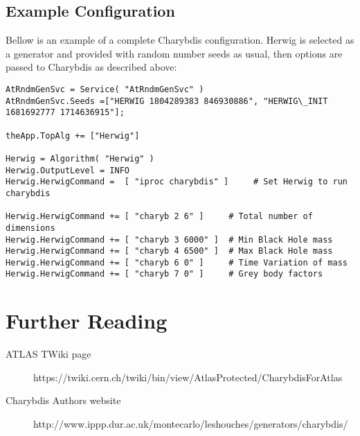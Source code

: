 \documentclass[11pt]{article}
\begin{document}
\subsection*{Example Configuration}

Bellow is an example of a complete Charybdis configuration. Herwig is selected as a generator and provided with random number seeds as usual, then options are passed to Charybdis as described above:

\begin{verbatim}
AtRndmGenSvc = Service( "AtRndmGenSvc" )
AtRndmGenSvc.Seeds =["HERWIG 1804289383 846930886", "HERWIG\_INIT 1681692777 1714636915"];

theApp.TopAlg += ["Herwig"]

Herwig = Algorithm( "Herwig" )
Herwig.OutputLevel = INFO
Herwig.HerwigCommand =  [ "iproc charybdis" ]     # Set Herwig to run charybdis

Herwig.HerwigCommand += [ "charyb 2 6" ]     # Total number of dimensions
Herwig.HerwigCommand += [ "charyb 3 6000" ]  # Min Black Hole mass
Herwig.HerwigCommand += [ "charyb 4 6500" ]  # Max Black Hole mass
Herwig.HerwigCommand += [ "charyb 6 0" ]     # Time Variation of mass
Herwig.HerwigCommand += [ "charyb 7 0" ]     # Grey body factors
\end{verbatim}

\section*{Further Reading}
\begin{description}
\item[ATLAS TWiki page] https://twiki.cern.ch/twiki/bin/view/AtlasProtected/CharybdisForAtlas
\item[Charybdis Authors website] http://www.ippp.dur.ac.uk/montecarlo/leshouches/generators/charybdis/
\end{description}
\end{document}
